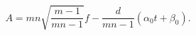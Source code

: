 \begin{equation}
A = mn \sqrt{\frac{m-1}{mn-1}} f - \frac{d}{mn-1} (\alpha_0 t +
\beta_0).
\end{equation}

